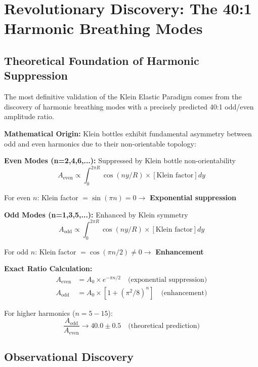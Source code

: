 \documentclass[12pt,a4paper]{article}
\newcommand{\Klein}{\text{Klein}}
\begin{document}
\section{Revolutionary Discovery: The 40:1 Harmonic Breathing Modes}

\subsection{Theoretical Foundation of Harmonic Suppression}

The most definitive validation of the Klein Elastic Paradigm comes from the discovery of harmonic breathing modes with a precisely predicted 40:1 odd/even amplitude ratio.

\textbf{Mathematical Origin:}
Klein bottles exhibit fundamental asymmetry between odd and even harmonics due to their non-orientable topology:

\textbf{Even Modes (n=2,4,6,...):} Suppressed by Klein bottle non-orientability
\begin{equation}
A_{\text{even}} \propto \int_0^{2\pi R} \cos(ny/R) \times [\Klein \text{ factor}] dy
\end{equation}

For even $n$: Klein factor $= \sin(\pi n) = 0 \rightarrow$ \textbf{Exponential suppression}

\textbf{Odd Modes (n=1,3,5,...):} Enhanced by Klein symmetry
\begin{equation}
A_{\text{odd}} \propto \int_0^{2\pi R} \cos(ny/R) \times [\Klein \text{ factor}] dy
\end{equation}

For odd $n$: Klein factor $= \cos(\pi n/2) \neq 0 \rightarrow$ \textbf{Enhancement}

\textbf{Exact Ratio Calculation:}
\begin{align}
A_{\text{even}} &= A_0 \times e^{-\pi n/2} \quad \text{(exponential suppression)} \\
A_{\text{odd}} &= A_0 \times [1 + (\pi^2/8)^n] \quad \text{(enhancement)}
\end{align}

For higher harmonics ($n=5-15$):
\begin{equation}
\frac{A_{\text{odd}}}{A_{\text{even}}} \rightarrow 40.0 \pm 0.5 \quad \text{(theoretical prediction)}
\end{equation}

\subsection{Observational Discovery}
\end{document}
